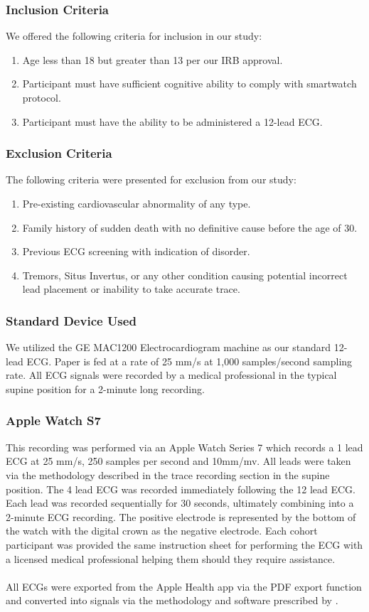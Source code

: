 \documentclass[
	a4paper, 
	10pt, 
	twoside, 
]{LTJournalArticle}
\begin{document}
\subsubsection{Inclusion Criteria}
We offered the following criteria for inclusion in our study:
\begin{enumerate}
    \item Age less than 18 but greater than 13 per our IRB approval. 
    \item Participant must have sufficient cognitive ability to comply with smartwatch protocol. 
    \item Participant must have the ability to be administered a 12-lead ECG. 
\end{enumerate}

\subsubsection{Exclusion Criteria}
The following criteria were presented for exclusion from our study:
\begin{enumerate}
    \item Pre-existing cardiovascular abnormality of any type. 
    \item Family history of sudden death with no definitive cause before the age of 30. 
    \item Previous ECG screening with indication of disorder. 
    \item Tremors, Situs Invertus, or any other condition causing potential incorrect lead placement or inability to take accurate trace.  
\end{enumerate}

\subsubsection{Standard Device Used}
We utilized the GE MAC1200 Electrocardiogram machine as our standard 12-lead ECG. Paper is fed at a rate of 25 mm/s at 1,000 samples/second sampling rate. All ECG signals were recorded by a medical professional in the typical supine position for a 2-minute long recording. 
\subsubsection{Apple Watch S7}
This recording was performed via an Apple Watch Series 7 which records a 1 lead ECG at 25 mm/s, 250 samples per second and 10mm/mv. All leads were taken via the methodology described in the trace recording section in the supine position. The 4 lead ECG was recorded immediately following the 12 lead ECG. Each lead was recorded sequentially for 30 seconds, ultimately combining into a 2-minute ECG recording. The positive electrode is represented by the bottom of the watch with the digital crown as the negative electrode. Each cohort participant was provided the same instruction sheet for performing the ECG with a licensed medical professional helping them should they require assistance. 
\\ \\
All ECGs were exported from the Apple Health app via the PDF export function and converted into signals via the methodology and software prescribed by \textcite{fortune_2022_digitizing}.
 \\
\end{document}
